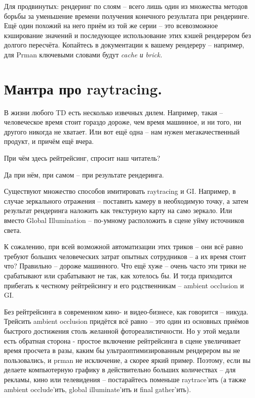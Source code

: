  Для
    продвинутых: рендеринг по слоям –
    всего лишь один из множества методов борьбы за уменьшение времени
    получения конечного результата при рендеринге. Ещё один похожий на
    него приём из той же серии – это всевозможное кэширование значений
    и последующее использование этих кэшей рендерером без долгого
    пересчёта. Копайтесь в документации к вашему рендереру – например,
    для Prman ключевыми
    словами будут {\it cache и} {\it brick.}

  \section*{Мантра про raytracing.}
  

 В жизни любого TD есть несколько
    извечных дилем. Например, такая – человеческое время стоит гораздо
    дороже, чем время машинное, и ни того, ни другого никогда не
    хватает. Или вот ещё одна – нам нужен мегакачественный продукт, и
    причём ещё вчера.
  

 При чём здесь рейтрейсинг, спросит наш читатель?  
  

 Да при нём, при самом – при результате
    рендеринга.
  

 Существуют множество способов имитировать raytracing и GI. Например, в
    случае зеркального отражения – поставить камеру в необходимую
    точку, а затем результат рендеринга наложить как текстурную карту
    на само зеркало. Или вместо Global Illumination –
    по-умному расположить в сцене уйму источников света.
  

 К сожалению, при всей возможной автоматизации этих
    триков – они всё равно требуют больших человеческих затрат опытных
    сотрудников – а их время стоит что? Правильно – дороже машинного.
    Что ещё хуже – очень часто эти трики не срабатывают или срабатывают
    не так, как хотелось бы. И тогда приходится прибегать к честному
    рейтрейсингу и его родственникам – ambient occlusion и GI.
  

 Без рейтрейсинга в современном кино- и
    видео-бизнесе, как говорится – никуда. Трейсить ambient occlusion
    придётся всё равно – это один из основных приёмов быстрого
    достижения столь желанной фотореалистичности. Но у этой медали есть
    обратная сторона - простое включение рейтрейсинга в сцене
    увеличивает время просчета в разы, каким бы ультраоптимизированным
    рендерером вы не пользовались, и prman не
    исключение, а скорее яркий пример. Поэтому, если вы делаете
    компьютерную графику в действительно больших количествах – для
    рекламы, кино или телевидения – постарайтесь поменьше raytrace’ить
    (а также ambient occlude’ить, global illuminate’ить и final
    gather’ить).

